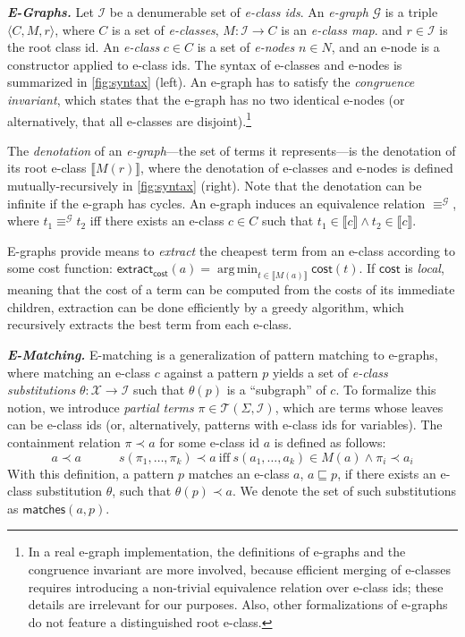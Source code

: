\documentclass[acmsmall,screen,nonacm,review=false,timestamp=false]{acmart}
\newcommand{\emphbf}[1]{\emph{\textbf{#1}\xspace}}
\newcommand{\mypara}[1]{\smallskip\noindent\emphbf{#1.}\xspace}
\newcommand{\semeq}{\equiv}
\newcommand{\patsof}[2]{\mathcal{T}(#1,#2)}
\newcommand{\sapp}[2]{{#1}({#2})}
\newcommand{\sub}{\sqsubseteq}
\newcommand{\matches}[2]{\mathsf{matches}(#1,#2)}
\newcommand{\denot}[1]{\llbracket #1 \rrbracket}
\newcommand{\eqg}{\semeq^{\mathcal{G}}}
\newcommand{\extract}{\mathsf{extract}}
\newcommand{\contains}[2]{{#1} \prec {#2}}
\newcommand{\cost}{\mathsf{cost}}
\DeclareMathOperator*{\argmin}{arg\,min}
\begin{document}
\mypara{E-Graphs}
Let $\mathcal{I}$ be a denumerable set of \emph{e-class ids}.
An \emph{e-graph} $\mathcal{G}$ is a triple $\langle C, M, r\rangle$,
where $C$ is a set of \emph{e-classes},
$M\colon \mathcal{I} \to C$ is an \emph{e-class map}.
and $r\in \mathcal{I}$ is the root class id.
An \emph{e-class} $c \in C$ is a set of \emph{e-nodes} $n \in N$,
and an e-node is a constructor applied to e-class ids.
The syntax of e-classes and e-nodes is summarized in \autoref{fig:syntax} (left).
An e-graph has to satisfy the \emph{congruence invariant},
which states that the e-graph has no two identical e-nodes
(or alternatively, that all e-classes are disjoint).\footnote{In a real e-graph implementation, the definitions of e-graphs and the congruence invariant
are more involved, 
because efficient merging of e-classes requires introducing a non-trivial equivalence relation over e-class ids;
these details are irrelevant for our purposes.
Also, other formalizations of e-graphs do not feature a distinguished root e-class.} 

The \emph{denotation} of an \emph{e-graph}---the set of terms it represents---is the denotation of its root e-class $\denot{M(r)}$,
where the denotation of e-classes and e-nodes is defined mutually-recursively
in \autoref{fig:syntax} (right).
Note that the denotation can be infinite if the e-graph has cycles.
An e-graph induces an equivalence relation $\eqg$, 
where $t_1 \eqg t_2$ iff there exists an e-class $c \in C$ such that $t_1 \in \denot{c} \wedge t_2\in \denot{c}$.

E-graphs provide means to \emph{extract} the cheapest term from an e-class according to some cost function:
$\extract_{\cost}(a) = \argmin_{t\in \denot{M(a)}} \cost(t)$.
If $\cost$ is \emph{local},
 meaning that the cost of a term can be computed 
 from the costs of its immediate children,
extraction can be done efficiently by a greedy algorithm,
which recursively extracts the best term from each e-class.

\mypara{E-Matching}
E-matching is a generalization of pattern matching to e-graphs,
where matching an e-class $c$ against a pattern $p$ yields a set of \emph{e-class substitutions} 
$\theta\colon \mathcal{X}\to \mathcal{I}$
such that $\sapp{\theta}{p}$ is a ``subgraph'' of $c$.
To formalize this notion, we introduce \emph{partial terms} $\pi \in \patsof{\Sigma}{\mathcal{I}}$,
which are terms whose leaves can be e-class ids
(or, alternatively, patterns with e-class ids for variables).
The containment relation $\contains{\pi}{a}$ for some e-class id $a$ is defined as follows:
$$
\contains{a}{a} \quad\quad\quad
\contains{s(\pi_1, \ldots, \pi_k)}{a}\ \text{iff}\ s(a_1, \ldots, a_k) \in M(a) \wedge \contains{\pi_i}{a_i}
$$
With this definition, a pattern $p$ matches an e-class $a$, $a \sub p$, if there exists an e-class substitution $\theta$,
such that $\contains{\sapp{\theta}{p}}{a}$.
We denote the set of such substitutions as $\matches{a}{p}$.
\end{document}
